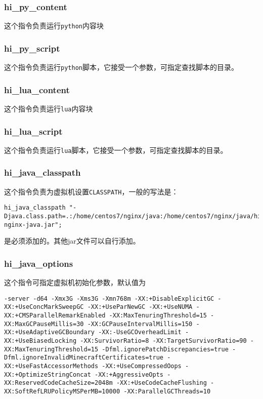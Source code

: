 \subsubsection{hi_py_content}
这个指令负责运行\texttt{python}内容块
\subsubsection{hi_py_script}
这个指令负责运行\texttt{python}脚本，它接受一个参数，可指定查找脚本的目录。
\subsubsection{hi_lua_content}
这个指令负责运行\texttt{lua}内容块
\subsubsection{hi_lua_script}
这个指令负责运行\texttt{lua}脚本，它接受一个参数，可指定查找脚本的目录。
\subsubsection{hi_java_classpath}
这个指令负责为虚拟机设置\texttt{CLASSPATH}，一般的写法是：
\begin{lstlisting}
hi_java_classpath "-Djava.class.path=.:/home/centos7/nginx/java:/home/centos7/nginx/java/hi-nginx-java.jar";
\end{lstlisting}
是必须添加的。其他jar文件可以自行添加。
\subsubsection{hi_java_options}
这个指令可指定虚拟机初始化参数，默认值为

\begin{lstlisting}
-server -d64 -Xmx3G -Xms3G -Xmn768m -XX:+DisableExplicitGC -XX:+UseConcMarkSweepGC -XX:+UseParNewGC -XX:+UseNUMA -XX:+CMSParallelRemarkEnabled -XX:MaxTenuringThreshold=15 -XX:MaxGCPauseMillis=30 -XX:GCPauseIntervalMillis=150 -XX:+UseAdaptiveGCBoundary -XX:-UseGCOverheadLimit -XX:+UseBiasedLocking -XX:SurvivorRatio=8 -XX:TargetSurvivorRatio=90 -XX:MaxTenuringThreshold=15 -Dfml.ignorePatchDiscrepancies=true -Dfml.ignoreInvalidMinecraftCertificates=true -XX:+UseFastAccessorMethods -XX:+UseCompressedOops -XX:+OptimizeStringConcat -XX:+AggressiveOpts -XX:ReservedCodeCacheSize=2048m -XX:+UseCodeCacheFlushing -XX:SoftRefLRUPolicyMSPerMB=10000 -XX:ParallelGCThreads=10
\end{lstlisting}

